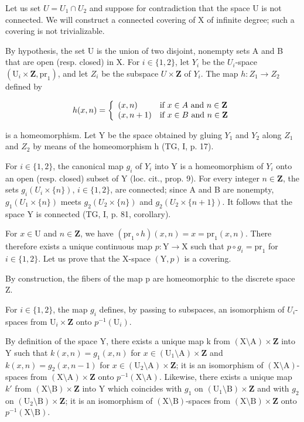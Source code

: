Let us set \(U = U_{1} \cap U_{2}\) and suppose for contradiction that the space U is not connected. We will construct a connected covering of X of infinite degree; such a covering is not trivializable.

By hypothesis, the set U is the union of two disjoint, nonempty sets A and B that are open (resp. closed) in X. For \(i \in \{1, 2\}\), let \(Y_i\) be the \(U_i\)-space \((\mathrm{U}_i \times \mathbf{Z}, \mathrm{pr}_1)\), and let \(Z_i\) be the subspace \(U \times \mathbf{Z}\) of \(Y_i\). The map \(h: Z_1 \to Z_2\) defined by

\[
h (x, n) = \left\{ \begin{array}{l l} (x, n) & \text {if } x\in A \text { and } n\in \mathbf {Z} \\ (x, n + 1) & \text {if } x\in B \text { and } n\in \mathbf {Z} \end{array} \right.
\]

is a homeomorphism. Let Y be the space obtained by gluing \(Y_{1}\) and \(Y_{2}\) along \(Z_{1}\) and \(Z_{2}\) by means of the homeomorphism h (TG, I, p. 17).

For \(i \in \{1,2\}\), the canonical map \(g_i\) of \(Y_i\) into Y is a homeomorphism of \(Y_i\) onto an open (resp. closed) subset of Y (loc. cit., prop. 9). For every integer \(n \in \mathbf{Z}\), the sets \(g_i(U_i \times \{n\})\), \(i \in \{1,2\}\), are connected; since A and B are nonempty, \(g_1(U_1 \times \{n\})\) meets \(g_2(U_2 \times \{n\})\) and \(g_2(U_2 \times \{n+1\})\). It follows that the space Y is connected (TG, I, p. 81, corollary).

For \(x \in \mathrm{U}\) and \(n \in \mathbf{Z}\), we have \((\mathrm{pr}_1 \circ h)(x, n) = x = \mathrm{pr}_1(x, n)\). There therefore exists a unique continuous map \(p \colon \mathrm{Y} \to \mathrm{X}\) such that \(p \circ g_i = \mathrm{pr}_1\) for \(i \in \{1, 2\}\). Let us prove that the X-space \((\mathrm{Y}, p)\) is a covering.

By construction, the fibers of the map p are homeomorphic to the discrete space Z.

For \(i \in \{1,2\}\), the map \(g_i\) defines, by passing to subspaces, an isomorphism of \(U_i\)-spaces from \(\mathrm{U}_i \times \mathbf{Z}\) onto \(p^{-1}(\mathrm{U}_i)\).

By definition of the space Y, there exists a unique map k from \((\mathrm{X}\setminus\mathrm{A})\times\mathbf{Z}\) into Y such that \(k(x,n)=g_{1}(x,n)\) for \(x\in(\mathrm{U}_{1}\setminus\mathrm{A})\times\mathbf{Z}\) and \(k(x,n)=g_{2}(x,n-1)\) for \(x\in(\mathrm{U}_{2}\setminus\mathrm{A})\times\mathbf{Z}\); it is an isomorphism of \((\mathrm{X}\setminus\mathrm{A})\)-spaces from \((\mathrm{X}\setminus\mathrm{A})\times\mathbf{Z}\) onto \(p^{-1}(\mathrm{X}\setminus\mathrm{A})\). Likewise, there exists a unique map \(k'\) from \((\mathrm{X}\setminus\mathrm{B})\times\mathbf{Z}\) into Y which coincides with \(g_{1}\) on \((\mathrm{U}_{1}\setminus\mathrm{B})\times\mathbf{Z}\) and with \(g_{2}\) on \((\mathrm{U}_{2}\setminus\mathrm{B})\times\mathbf{Z}\); it is an isomorphism of \((\mathrm{X}\setminus\mathrm{B})\)-spaces from \((\mathrm{X}\setminus\mathrm{B})\times\mathbf{Z}\) onto \(p^{-1}(\mathrm{X}\setminus\mathrm{B})\).

